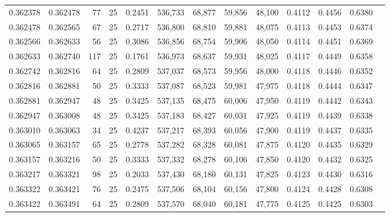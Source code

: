 \begin{tabular}{rrrrrrrrrrrrr}
0.362378 & 0.362478 &    77 &  25 &                                     0.2451 & 536,733 &  68,877 &  59,856 &  48,100 & 0.4112 & 0.4456 & 0.6380 \\
0.362478 & 0.362565 &    67 &  25 &                                     0.2717 & 536,800 &  68,810 &  59,881 &  48,075 & 0.4113 & 0.4453 & 0.6374 \\
0.362566 & 0.362633 &    56 &  25 &                                     0.3086 & 536,856 &  68,754 &  59,906 &  48,050 & 0.4114 & 0.4451 & 0.6369 \\
0.362633 & 0.362740 &   117 &  25 &                                     0.1761 & 536,973 &  68,637 &  59,931 &  48,025 & 0.4117 & 0.4449 & 0.6358 \\
0.362742 & 0.362816 &    64 &  25 &                                     0.2809 & 537,037 &  68,573 &  59,956 &  48,000 & 0.4118 & 0.4446 & 0.6352 \\
0.362816 & 0.362881 &    50 &  25 &                                     0.3333 & 537,087 &  68,523 &  59,981 &  47,975 & 0.4118 & 0.4444 & 0.6347 \\
0.362881 & 0.362947 &    48 &  25 &                                     0.3425 & 537,135 &  68,475 &  60,006 &  47,950 & 0.4119 & 0.4442 & 0.6343 \\
0.362947 & 0.363008 &    48 &  25 &                                     0.3425 & 537,183 &  68,427 &  60,031 &  47,925 & 0.4119 & 0.4439 & 0.6338 \\
0.363010 & 0.363063 &    34 &  25 &                                     0.4237 & 537,217 &  68,393 &  60,056 &  47,900 & 0.4119 & 0.4437 & 0.6335 \\
0.363065 & 0.363157 &    65 &  25 &                                     0.2778 & 537,282 &  68,328 &  60,081 &  47,875 & 0.4120 & 0.4435 & 0.6329 \\
0.363157 & 0.363216 &    50 &  25 &                                     0.3333 & 537,332 &  68,278 &  60,106 &  47,850 & 0.4120 & 0.4432 & 0.6325 \\
0.363217 & 0.363321 &    98 &  25 &                                     0.2033 & 537,430 &  68,180 &  60,131 &  47,825 & 0.4123 & 0.4430 & 0.6316 \\
0.363322 & 0.363421 &    76 &  25 &                                     0.2475 & 537,506 &  68,104 &  60,156 &  47,800 & 0.4124 & 0.4428 & 0.6308 \\
0.363422 & 0.363491 &    64 &  25 &                                     0.2809 & 537,570 &  68,040 &  60,181 &  47,775 & 0.4125 & 0.4425 & 0.6303 \\

\end{tabular}
